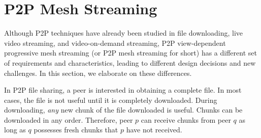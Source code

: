 
   
\section{P2P Mesh Streaming}
\label{s:comp}

    Although P2P techniques have already been studied in
    file downloading, live video streaming, and
    video-on-demand streaming, P2P view-dependent
    progressive mesh streaming (or P2P mesh streaming for
    short) has a different set of requirements and
    characteristics, leading to different design decisions and
    new challenges.
    In this section, we elaborate on these differences.

    In P2P file sharing, a peer is interested in obtaining a
    complete file.  In most cases, the file is not useful
    until it is completely downloaded.  During downloading,
    \textit{any} new chunk of the file downloaded is useful.
    Chunks can be downloaded in any order.
    Therefore, peer $p$ can receive chunks from peer $q$ as
    long as $q$ possesses fresh chunks that $p$ have
    not received.

